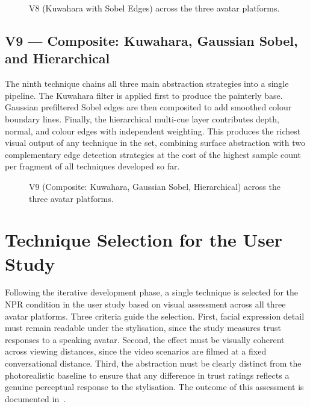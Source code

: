\begin{figure}[H]
  \centering
  \caption{V8 (Kuwahara with Sobel Edges) across the three avatar platforms.}
  \label{fig:v8_platforms}
\end{figure}

\subsection{V9 — Composite: Kuwahara, Gaussian Sobel, and Hierarchical}
\label{sec:v9}

The ninth technique chains all three main abstraction strategies into a single pipeline. The Kuwahara filter is applied first to produce the painterly base. Gaussian prefiltered Sobel edges are then composited to add smoothed colour boundary lines. Finally, the hierarchical multi-cue layer contributes depth, normal, and colour edges with independent weighting. This produces the richest visual output of any technique in the set, combining surface abstraction with two complementary edge detection strategies at the cost of the highest sample count per fragment of all techniques developed so far.

\begin{figure}[H]
  \centering
  \caption{V9 (Composite: Kuwahara, Gaussian Sobel, Hierarchical) across the three avatar platforms.}
  \label{fig:v9_platforms}
\end{figure}

\section{Technique Selection for the User Study}
\label{sec:technique_selection}

Following the iterative development phase, a single technique is selected for the NPR condition in the user study based on visual assessment across all three avatar platforms. Three criteria guide the selection. First, facial expression detail must remain readable under the stylisation, since the study measures trust responses to a speaking avatar. Second, the effect must be visually coherent across viewing distances, since the video scenarios are filmed at a fixed conversational distance. Third, the abstraction must be clearly distinct from the photorealistic baseline to ensure that any difference in trust ratings reflects a genuine perceptual response to the stylisation. The outcome of this assessment is documented in~.

